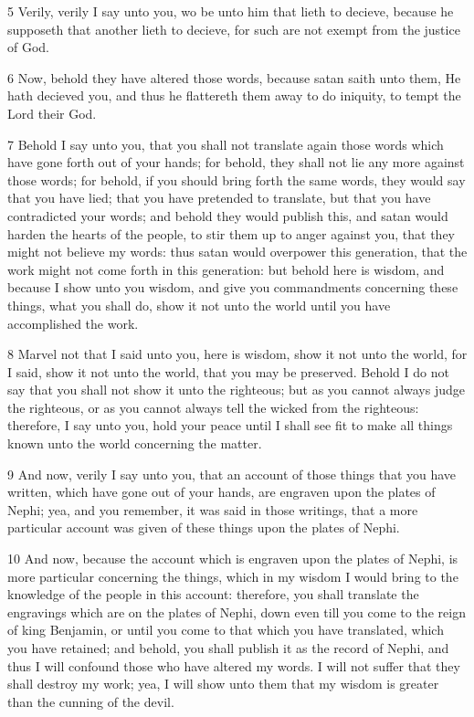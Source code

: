 				5 Verily, verily I say unto you, wo be unto him that lieth to decieve, because he supposeth that another lieth to decieve, for such are not exempt from the justice of God.

				6 Now, behold they have altered those words, because satan saith unto them, He hath decieved you, and thus he flattereth them away to do iniquity, to tempt the Lord their God.

				7 Behold I say unto you, that you shall not translate again those words which have gone forth out of your hands; for behold, they shall not lie any more against those words; for behold, if you should bring forth the same words, they would say that you have lied; that you have pretended to translate, but that you have contradicted your words; and behold they would publish this, and satan would harden the hearts of the people, to stir them up to anger against you, that they might not believe my words: thus satan would overpower this generation, that the work might not come forth in this generation: but behold here is wisdom, and because I show unto you wisdom, and give you commandments concerning these things, what you shall do, show it not unto the world until you have accomplished the work.

				8 Marvel not that I said unto you, here is wisdom, show it not unto the world, for I said, show it not unto the world, that you may be preserved. Behold I do not say that you shall not show it unto the righteous; but as you cannot always judge the righteous, or as you cannot always tell the wicked from the righteous: therefore, I say unto you, hold your peace until I shall see fit to make all things known unto the world concerning the matter.

				9 And now, verily I say unto you, that an account of those things that you have written, which have gone out of your hands, are engraven upon the plates of Nephi; yea, and you remember, it was said in those writings, that a more particular account was given of these things upon the plates of Nephi.

				10 And now, because the account which is engraven upon the plates of Nephi, is more particular concerning the things, which in my wisdom I would bring to the knowledge of the people in this account: therefore, you shall translate the engravings which are on the plates of Nephi, down even till you come to the reign of king Benjamin, or until you come to that which you have translated, which you have retained; and behold, you shall publish it as the record of Nephi, and thus I will confound those who have altered my words. I will not suffer that they shall destroy my work; yea, I will show unto them that my wisdom is greater than the cunning of the devil.

